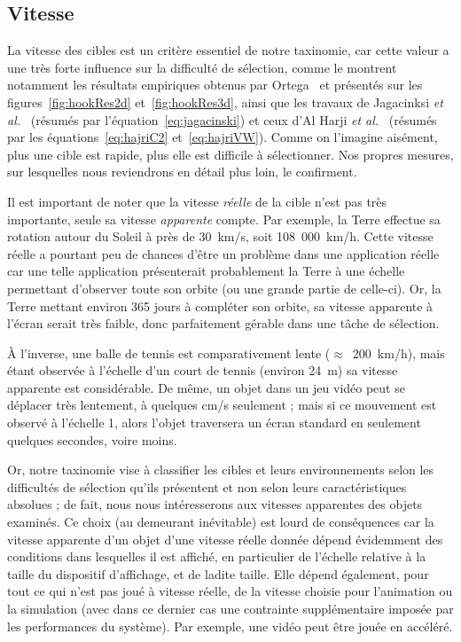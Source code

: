 	\FloatBarrier \subsection{Vitesse}
	La vitesse des cibles est un critère essentiel de notre taxinomie, car cette valeur a une très forte influence sur la difficulté de sélection, comme le montrent notamment les résultats empiriques obtenus par Ortega~\cite{ortega2013hook} et présentés sur les figures~\ref{fig:hookRes2d} et~\ref{fig:hookRes3d}, ainsi que les travaux de Jagacinksi \emph{et al.}~\cite{jagacinski1980test} (résumés par l'équation~\ref{eq:jagacinski}) et ceux d'Al Harji \emph{et al.}~\cite{hajri2011moving} (résumés par les équations~\ref{eq:hajriC2} et~\ref{eq:hajriVW}). Comme on l'imagine aisément, plus une cible est rapide, plus elle est difficile à sélectionner. Nos propres mesures, sur lesquelles nous reviendrons en détail plus loin, le confirment.
	
	Il est important de noter que la vitesse \emph{réelle} de la cible n'est pas très importante, seule sa vitesse \emph{apparente} compte. Par exemple, la Terre effectue sa rotation autour du Soleil à près de 30~km/s, soit 108~000~km/h. Cette vitesse réelle a pourtant peu de chances d'être un problème dans une application réelle car une telle application présenterait probablement la Terre à une échelle permettant d'observer toute son orbite (ou une grande partie de celle-ci). Or, la Terre mettant environ 365 jours à compléter son orbite, sa vitesse apparente à l'écran serait très faible, donc parfaitement gérable dans une tâche de sélection.
	
	À l'inverse, une balle de tennis est comparativement lente ($\approx$~200~km/h), mais étant observée à l'échelle d'un court de tennis (environ 24~m) sa vitesse apparente est considérable. De même, un objet dans un jeu vidéo peut se déplacer très lentement, à quelques cm/s seulement ; mais si ce mouvement est observé à l'échelle 1, alors l'objet traversera un écran standard en seulement quelques secondes, voire moins.
	
	Or, notre taxinomie vise à classifier les cibles et leurs environnements selon les difficultés de sélection qu'ils présentent et non selon leurs caractéristiques absolues ; de fait, nous nous intéresserons aux vitesses apparentes des objets examinés. Ce choix (au demeurant inévitable) est lourd de conséquences car la vitesse apparente d'un objet d'une vitesse réelle donnée dépend évidemment des conditions dans lesquelles il est affiché, en particulier de l'échelle relative à la taille du dispositif d'affichage, et de ladite taille. Elle dépend également, pour tout ce qui n'est pas joué à vitesse réelle, de la vitesse choisie pour l'animation ou la simulation (avec dans ce dernier cas une contrainte supplémentaire imposée par les performances du système). Par exemple, une vidéo peut être jouée en accéléré.
	
